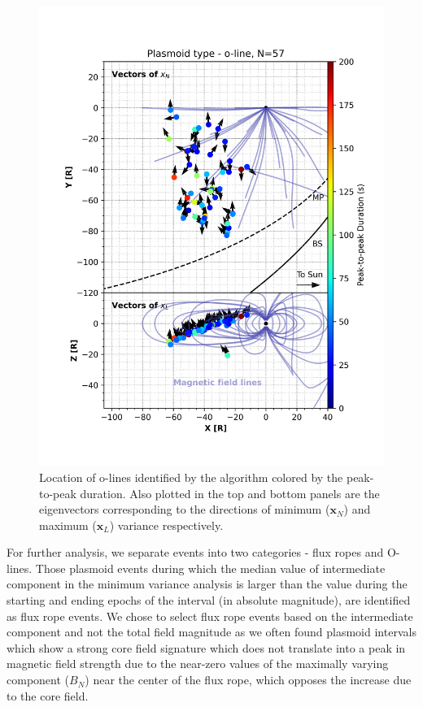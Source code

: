 \begin{figure}
    \centering
    \includegraphics{images6/TrajectoryLocationofEvent_quiver_o-line.png}
    \caption{Location of o-lines identified by the algorithm colored by the peak-to-peak duration. Also plotted in the top and bottom panels are the eigenvectors corresponding to the directions of minimum ($\mathbf{x}_N$) and maximum ($\mathbf{x}_L$) variance respectively.}
    \label{fig:trajectory-quiver-olines}
\end{figure}

For further analysis, we separate events into two categories - flux ropes and O-lines. Those plasmoid events during which the median value of intermediate component in the minimum variance analysis is larger than the value during the starting and ending epochs of the interval (in absolute magnitude), are identified as flux rope events. We chose to select flux rope events based on the intermediate component and not the total field magnitude as we often found plasmoid intervals which show a strong core field signature which does not translate into a peak in magnetic field strength due to the near-zero values of the maximally varying component ($B_N$) near the center of the flux rope, which opposes the increase due to the core field. 

